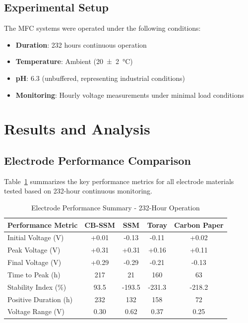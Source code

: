 \documentclass[12pt,a4paper]{article}
\begin{document}
\subsection{Experimental Setup}

The MFC systems were operated under the following conditions:
\begin{itemize}
    \item \textbf{Duration}: 232 hours continuous operation
    \item \textbf{Temperature}: Ambient (\SI{20 \pm 2}{\celsius})
    \item \textbf{pH}: 6.3 (unbuffered, representing industrial conditions)
    \item \textbf{Monitoring}: Hourly voltage measurements under minimal load conditions
\end{itemize}

\section{Results and Analysis}

\subsection{Electrode Performance Comparison}

Table~\ref{tab:performance_summary} summarizes the key performance metrics for all electrode materials tested based on 232-hour continuous monitoring.

\begin{table}[H]
\centering
\caption{Electrode Performance Summary - 232-Hour Operation}
\label{tab:performance_summary}
\begin{tabular}{@{}lcccc@{}}
\toprule
\textbf{Performance Metric} & \textbf{CB-SSM} & \textbf{SSM} & \textbf{Toray} & \textbf{Carbon Paper} \\
\midrule
Initial Voltage (\si{\volt}) & +0.01 & -0.13 & -0.11 & +0.02 \\
Peak Voltage (\si{\volt}) & +0.31 & +0.31 & +0.16 & +0.11 \\
Final Voltage (\si{\volt}) & +0.29 & -0.29 & -0.21 & -0.13 \\
Time to Peak (\si{\hour}) & 217 & 21 & 160 & 63 \\
Stability Index (\%) & 93.5 & -193.5 & -231.3 & -218.2 \\
Positive Duration (\si{\hour}) & 232 & 132 & 158 & 72 \\
Voltage Range (\si{\volt}) & 0.30 & 0.62 & 0.37 & 0.25 \\
\bottomrule
\end{tabular}
\end{table}
\end{document}

